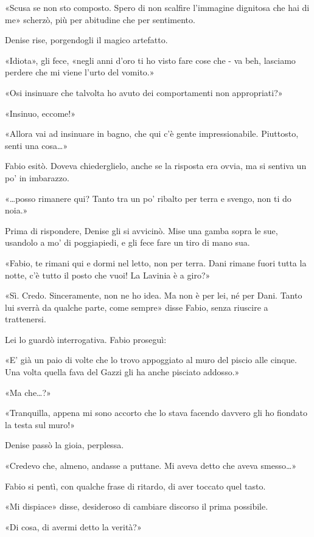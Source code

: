 «Scusa se non sto composto. Spero di non scalfire l'immagine dignitosa che hai di me» scherzò, più per abitudine che per sentimento.

Denise rise, porgendogli il magico artefatto.

«Idiota», gli fece, «negli anni d'oro ti ho visto fare cose che - va beh, lasciamo perdere che mi viene l'urto del vomito.»

«Osi insinuare che talvolta ho avuto dei comportamenti non appropriati?»

«Insinuo, eccome!»

«Allora vai ad insinuare in bagno, che qui c'è gente impressionabile. Piuttosto, senti una cosa\ldots»


Fabio esitò. Doveva chiederglielo, anche se la risposta era ovvia, ma si sentiva un po' in imbarazzo.

«\ldots posso rimanere qui? Tanto tra un po' ribalto per terra e svengo, non ti do noia.»

Prima di rispondere, Denise gli si avvicinò. Mise una gamba sopra le sue, usandolo a mo' di poggiapiedi, e gli fece fare un tiro di mano sua.

«Fabio, te rimani qui e dormi nel letto, non per terra. Dani rimane fuori tutta la notte, c'è tutto il posto che vuoi! La Lavinia è a giro?»

«Sì. Credo. Sinceramente, non ne ho idea. Ma non è per lei, né per Dani. Tanto lui sverrà da qualche parte, come sempre» disse Fabio, senza riuscire a trattenersi.

Lei lo guardò interrogativa. Fabio proseguì:

«E' già un paio di volte che lo trovo appoggiato al muro del piscio alle cinque. Una volta quella fava del Gazzi gli ha anche pisciato addosso.»

«Ma che\ldots?»

«Tranquilla, appena mi sono accorto che lo stava facendo davvero gli ho fiondato la testa sul muro!»

Denise passò la gioia, perplessa.

«Credevo che, almeno, andasse a puttane. Mi aveva detto che aveva smesso\ldots»

Fabio si pentì, con qualche frase di ritardo, di aver toccato quel tasto.

«Mi dispiace» disse, desideroso di cambiare discorso il prima possibile.

«Di cosa, di avermi detto la verità?»

